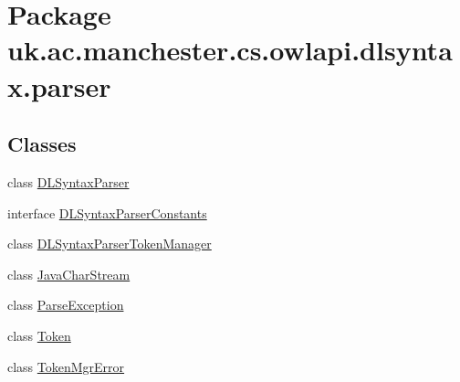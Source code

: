 \hypertarget{namespaceuk_1_1ac_1_1manchester_1_1cs_1_1owlapi_1_1dlsyntax_1_1parser}{\section{Package uk.\-ac.\-manchester.\-cs.\-owlapi.\-dlsyntax.\-parser}
\label{namespaceuk_1_1ac_1_1manchester_1_1cs_1_1owlapi_1_1dlsyntax_1_1parser}
}
\subsection*{Classes}
\begin{DoxyCompactItemize}
\item 
class \hyperlink{classuk_1_1ac_1_1manchester_1_1cs_1_1owlapi_1_1dlsyntax_1_1parser_1_1_d_l_syntax_parser}{D\-L\-Syntax\-Parser}
\item 
interface \hyperlink{interfaceuk_1_1ac_1_1manchester_1_1cs_1_1owlapi_1_1dlsyntax_1_1parser_1_1_d_l_syntax_parser_constants}{D\-L\-Syntax\-Parser\-Constants}
\item 
class \hyperlink{classuk_1_1ac_1_1manchester_1_1cs_1_1owlapi_1_1dlsyntax_1_1parser_1_1_d_l_syntax_parser_token_manager}{D\-L\-Syntax\-Parser\-Token\-Manager}
\item 
class \hyperlink{classuk_1_1ac_1_1manchester_1_1cs_1_1owlapi_1_1dlsyntax_1_1parser_1_1_java_char_stream}{Java\-Char\-Stream}
\item 
class \hyperlink{classuk_1_1ac_1_1manchester_1_1cs_1_1owlapi_1_1dlsyntax_1_1parser_1_1_parse_exception}{Parse\-Exception}
\item 
class \hyperlink{classuk_1_1ac_1_1manchester_1_1cs_1_1owlapi_1_1dlsyntax_1_1parser_1_1_token}{Token}
\item 
class \hyperlink{classuk_1_1ac_1_1manchester_1_1cs_1_1owlapi_1_1dlsyntax_1_1parser_1_1_token_mgr_error}{Token\-Mgr\-Error}
\end{DoxyCompactItemize}
